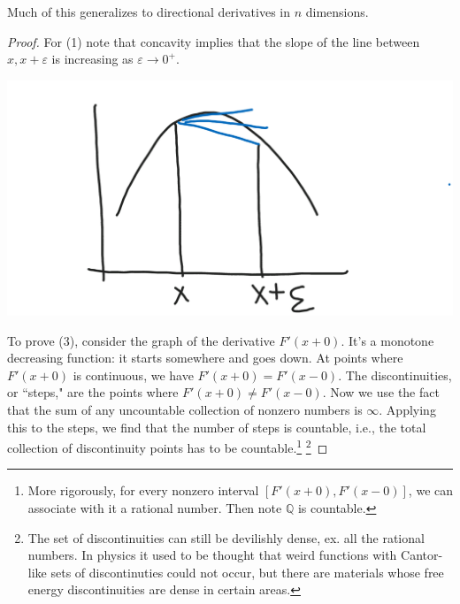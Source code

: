 \documentclass[12pt]{book}
\theoremstyle{norm}
\begin{document}
Much of this generalizes to directional derivatives in $n$ dimensions.
\begin{proof}
For (1) note that concavity implies that the slope of the line between $x,x+\varepsilon$ is increasing as $\varepsilon\to 0^+$.

\begin{center}\includegraphics[scale=.25]{images/2-1}\end{center}

To prove (3), consider the graph of the derivative $F'(x + 0)$. It's a monotone decreasing function: it starts somewhere and goes down. 
At points where $F'(x+0)$ is continuous, we have $F'(x+0)=F'(x-0)$. The discontinuities, or ``steps," are the points where $F'(x+0)\ne F'(x-0)$. Now we use the fact that the sum of any uncountable collection of nonzero numbers is $\infty$. 
Applying this to the steps, we find that the number of steps is countable, i.e., the total collection of discontinuity points has to be countable.\footnote{More rigorously, for every nonzero interval $[F'(x+0),F'(x-0)]$, we can associate with it a rational number. Then note $\mathbb{Q}$ is countable.}
\footnote{The set of discontinuities can still be devilishly dense, ex. all the rational numbers. In physics it used to be thought that weird functions with Cantor-like sets of discontinuties could not occur, but there are materials whose free energy discontinuities are dense in certain areas.}


\end{proof}
\end{document}
